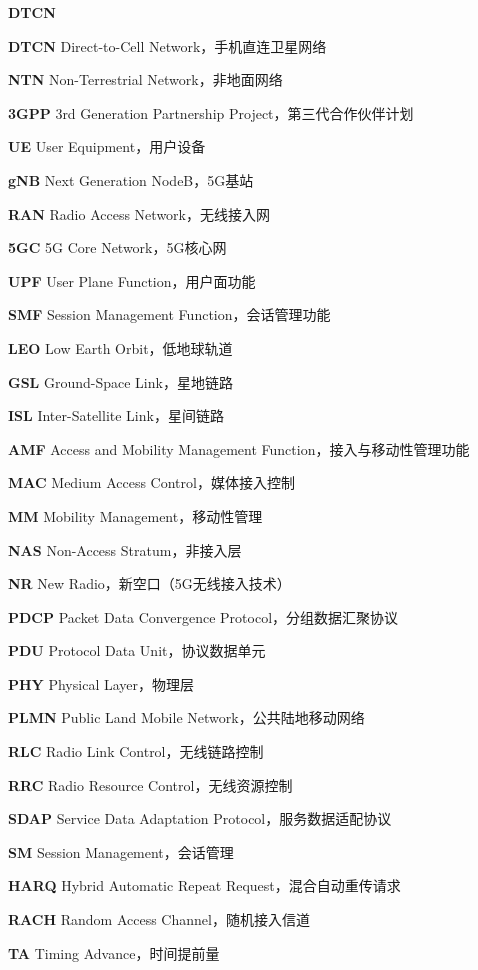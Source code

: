  \begin{labeling}{\textbf{DTCN}}
  \setlength{\parskip}{0pt plus1pt minus1pt}
  \item [\textbf{DTCN}] Direct-to-Cell Network，手机直连卫星网络
  \item [\textbf{NTN}] Non-Terrestrial Network，非地面网络
  \item [\textbf{3GPP}] 3rd Generation Partnership Project，第三代合作伙伴计划
  \item [\textbf{UE}] User Equipment，用户设备
  \item [\textbf{gNB}] Next Generation NodeB，5G基站
  \item [\textbf{RAN}] Radio Access Network，无线接入网
  \item [\textbf{5GC}] 5G Core Network，5G核心网
  \item [\textbf{UPF}] User Plane Function，用户面功能
  \item [\textbf{SMF}] Session Management Function，会话管理功能
  \item [\textbf{LEO}] Low Earth Orbit，低地球轨道
  \item [\textbf{GSL}] Ground-Space Link，星地链路
  \item [\textbf{ISL}] Inter-Satellite Link，星间链路
  \item [\textbf{AMF}] Access and Mobility Management Function，接入与移动性管理功能
  \item [\textbf{MAC}] Medium Access Control，媒体接入控制
  \item [\textbf{MM}] Mobility Management，移动性管理
  \item [\textbf{NAS}] Non-Access Stratum，非接入层
  \item [\textbf{NR}] New Radio，新空口（5G无线接入技术）
  \item [\textbf{PDCP}] Packet Data Convergence Protocol，分组数据汇聚协议
  \item [\textbf{PDU}] Protocol Data Unit，协议数据单元
  \item [\textbf{PHY}] Physical Layer，物理层
  \item [\textbf{PLMN}] Public Land Mobile Network，公共陆地移动网络
  \item [\textbf{RLC}] Radio Link Control，无线链路控制
  \item [\textbf{RRC}] Radio Resource Control，无线资源控制
  \item [\textbf{SDAP}] Service Data Adaptation Protocol，服务数据适配协议
  \item [\textbf{SM}] Session Management，会话管理
  \item [\textbf{HARQ}] Hybrid Automatic Repeat Request，混合自动重传请求
  \item [\textbf{RACH}] Random Access Channel，随机接入信道
  \item [\textbf{TA}] Timing Advance，时间提前量

\end{labeling}
\titlespacing{\chapter}{0pt}{-6mm}{5mm}
\clearpage{\pagestyle{empty}\cleardoublepage}

